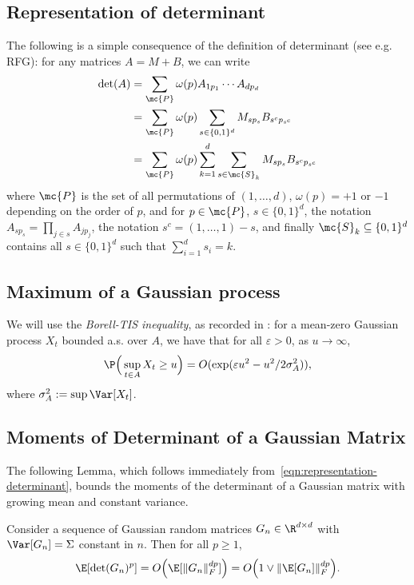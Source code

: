 \documentclass{article}
\begin{document}
	\subsection{Representation of determinant}
	The following is a simple consequence of the definition of determinant (see e.g. RFG): for any matrices $A = M + B$, we can write
	\begin{equation}
		\label{eqn:representation-determinant}
		\begin{aligned}
			\det(A) 
			& = \sum_{\mc{P}} \omega(p) A_{1p_1} \cdots A_{dp_d} \\
			& = \sum_{\mc{P}} \omega(p) \sum_{s \in \{0,1\}^d} M_{sp_s} B_{s^cp_{s^c}} \\
			& = \sum_{\mc{P}} \omega(p) \sum_{k = 1}^{d} \sum_{s \in \mc{S}_k} M_{sp_s} B_{s^cp_{s^c}}
		\end{aligned}
	\end{equation}
	where $\mc{P}$ is the set of all permutations of $(1,\ldots,d)$, $\omega(p) = +1$ or $-1$ depending on the order of $p$, and for $p \in \mc{P}$, $s \in \{0,1\}^d$, the notation $A_{sp_s} = \prod_{j \in s} A_{jp_j}$, the notation $s^c = (1,\ldots,1) - s$, and finally $\mc{S}_k \subseteq \{0,1\}^d$ contains all $s \in \{0,1\}^d$ such that $\sum_{i = 1}^{d} s_i = k$.
	
	\subsection{Maximum of a Gaussian process}
	We will use the \emph{Borell-TIS inequality}, as recorded in : for a mean-zero Gaussian process $X_t$ bounded a.s. over $A$, we have that for all $\varepsilon > 0$, as $u \to \infty$,
	\begin{equation}
		\label{eqn:borell-tis}
		\P\Big(\sup_{t \in A} X_t \geq u\Big) = O(\exp(\varepsilon u^2 - u^2/2\sigma_{A}^2)), 
	\end{equation}
	where $\sigma_{A}^2 := \sup \Var[X_t]$.  
	
	\subsection{Moments of Determinant of a Gaussian Matrix}
	The following Lemma, which follows immediately from~\eqref{eqn:representation-determinant}, bounds the moments of the determinant of a Gaussian matrix with growing mean and constant variance.
	\begin{lemma}
		\label{lem:determinant-moments}
		Consider a sequence of Gaussian random matrices $G_n \in \R^{d \times d}$ with $\Var[G_n] = \Sigma$ constant in $n$. Then for all $p \geq 1$,
		\begin{equation*}
			\E[\det(G_n)^{p}] = O\Big(\E[\|G_n\|_F^{dp}]\Big) = O\Big(1 \vee \|\E[G_n]\|_{F}^{dp}\Big).
		\end{equation*} 
	\end{lemma}
	
\end{document}
